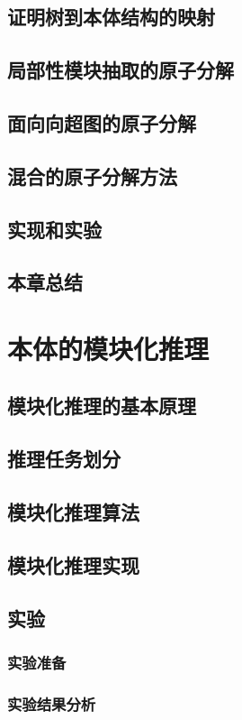 \section{证明树到本体结构的映射}
\section{局部性模块抽取的原子分解}
\section{面向向超图的原子分解}
\section{混合的原子分解方法}
\section{实现和实验}
\section{本章总结}

\chapter{本体的模块化推理}
\section{模块化推理的基本原理}
\section{推理任务划分}
\section{模块化推理算法}
\section{模块化推理实现}
\section{实验}
\subsection{实验准备}
\subsection{实验结果分析}
